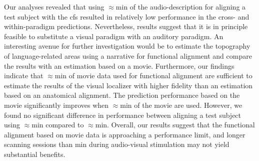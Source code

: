 %
Our analyses revealed that using $\approx$\unit[15]{min} of the
audio-description for aligning a test subject with the \ac{cfs} resulted in
relatively low performance in the cross- and within-paradigm predictions.
%
Nevertheless, results suggest that it is in principle feasible to substitute a
visual paradigm with an auditory paradigm.
%
An interesting avenue for further investigation would be to estimate the
topography of language-related areas using a narrative for functional alignment
and compare the results with an estimation based on a movie.
%
Furthermore, our findings indicate that $\approx$\unit[15]{min} of movie data
used for functional alignment are sufficient to estimate the results of the
visual localizer with higher fidelity than an estimation based on an anatomical
alignment.
%
The prediction performance based on the movie significantly improves when
$\approx$\unit[30]{min} of the movie are used.
%
However, we found no significant difference in performance between aligning a
test subject using $\approx$\unit[45]{min} compared to $\approx$\unit[30]{min}.
%
Overall, our results suggest that the functional alignment based on movie data
is approaching a performance limit, and longer scanning sessions than
\unit[30]{min} during audio-visual stimulation may not yield substantial
benefits.



